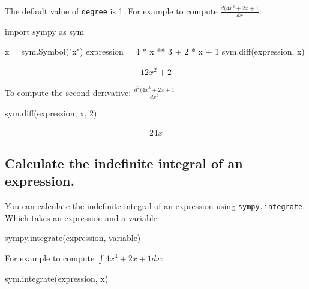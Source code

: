 The default value of \texttt{degree} is 1.
For example to compute \(\frac{d (4 x ^ 3 + 2 x + 1}{dx}\):




\begin{pyin}
import sympy as sym

x = sym.Symbol("x")
expression = 4 * x ** 3 + 2 * x + 1
sym.diff(expression, x)
\end{pyin}




\begin{equation*}
\begin{split}\displaystyle 12 x^{2} + 2\end{split}
\end{equation*}




To compute the second derivative: \(\frac{d ^ 2 (4 x ^ 3 + 2 x + 1}{dx ^ 2}\)




\begin{pyin}
sym.diff(expression, x, 2)
\end{pyin}




\begin{equation*}
\begin{split}\displaystyle 24 x\end{split}
\end{equation*}




\subsection{Calculate the indefinite integral of an expression.}
\label{\detokenize{tools-for-mathematics/03-calculus/how/main:calculate-the-indefinite-integral-of-an-expression}}

You can calculate the indefinite integral of an expression using
\texttt{sympy.integrate}. Which takes an expression and a variable.


\begin{api}
sympy.integrate(expression, variable)
\end{api}



For example to compute \(\int 4x^3 + 2x + 1 dx\):




\begin{pyin}
sym.integrate(expression, x)
\end{pyin}




